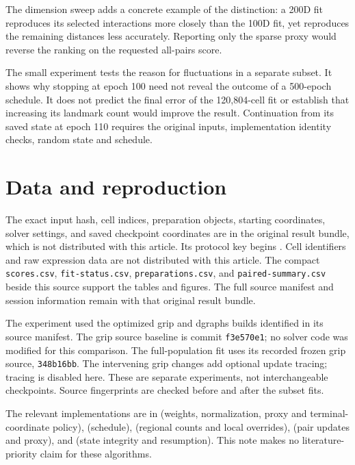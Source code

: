 \documentclass[11pt]{article}
\begin{document}
The dimension sweep adds a concrete example of the distinction: a 200D
fit reproduces its selected interactions more closely than the 100D fit,
yet reproduces the remaining distances less accurately. Reporting only
the sparse proxy would reverse the ranking on the requested all-pairs score.

The small experiment tests the reason for fluctuations in a separate subset.
It shows why stopping at epoch 100 need not reveal the outcome of a 500-epoch
schedule. It does not predict the final error of the 120,804-cell fit or
establish that increasing its landmark count would improve the result.
Continuation from its saved state at epoch 110 requires the original inputs,
implementation identity checks, random state and schedule.



\appendix
\section{Data and reproduction}
The exact input hash, cell indices, preparation objects, starting
coordinates, solver settings, and saved checkpoint coordinates are in the
original result bundle, which is not distributed with this article.
Its protocol key begins \resultkey. Cell identifiers and raw expression
data are not distributed with this article. The compact
\texttt{scores.csv}, \texttt{fit-status.csv}, \texttt{preparations.csv},
and \texttt{paired-summary.csv} beside this source support the tables
and figures. The full source manifest and session information remain with
that original result bundle.

The experiment used the optimized grip and dgraphs builds identified in its source manifest.
The grip source baseline is commit \texttt{f3e570e1}; no solver code was
modified for this comparison. The full-population fit uses its
recorded frozen grip source, \texttt{348b16bb}. The intervening grip changes
add optional update tracing; tracing is disabled here. These are separate
experiments, not interchangeable checkpoints. Source fingerprints are
checked before and after the subset fits.

The relevant implementations are in  (weights,
normalization, proxy and terminal-coordinate policy),
 (schedule),
 (regional counts and local overrides),
 (pair updates and proxy),
and  (state integrity and resumption).
This note makes no literature-priority claim for these algorithms.
\end{document}
